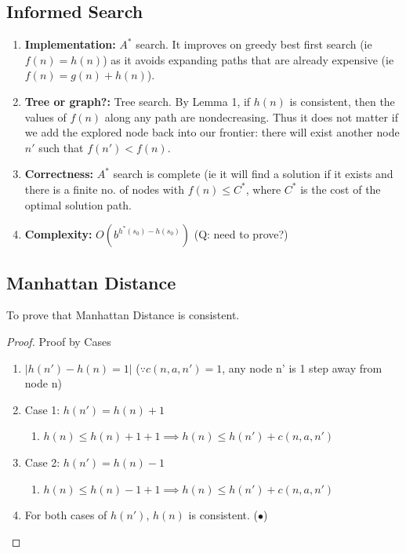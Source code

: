 \documentclass[runningheads]{llncs}
\begin{document}
\subsection{Informed Search}
\begin{enumerate}
    \item \textbf{Implementation:} \( A^* \) search. It improves on greedy best first search (ie \( f(n) = h(n) \)) as it avoids expanding paths that are already expensive (ie \( f(n) = g(n) + h(n) \)).
    \item \textbf{Tree or graph?:} Tree search. By Lemma 1, if \( h(n) \) is consistent, then the values of \( f(n) \) along any path are nondecreasing. Thus it does not matter if we add the explored node back into our frontier: there will exist another node \( n' \) such that \( f(n') < f(n) \).
    \item \textbf{Correctness:} \( A^* \) search is complete (ie it will find a solution if it exists and there is a finite no. of nodes with \( f(n) \leq C^{*} \), where \( C^* \) is the cost of the optimal solution path.
    \item \textbf{Complexity:} \( O(b^{h^*(s_0) - h(s_0)}) \) (Q: need to prove?)
\end{enumerate}

\subsection{Manhattan Distance} 
To prove that Manhattan Distance is consistent.
\begin{proof} Proof by Cases
    \begin{enumerate}
        \item \( |h(n') - h(n) = 1| \) (\( \because c(n, a, n') = 1 \), any node n' is 1 step away from node n)
        \item Case 1: \( h(n') = h(n) + 1 \)
        \begin{enumerate}
            \item \( h(n) \leq h(n) + 1 + 1 \implies h(n) \leq h(n') + c(n, a, n') \)
        \end{enumerate}
        \item Case 2: \( h(n') = h(n) - 1 \)
        \begin{enumerate}
            \item \( h(n) \leq h(n) - 1 + 1 \implies h(n) \leq h(n') + c(n, a, n') \)
        \end{enumerate}
        \item For both cases of \( h(n') \), \( h(n) \) is consistent. (\(\bullet\))
    \end{enumerate}
\end{proof}
\end{document}
